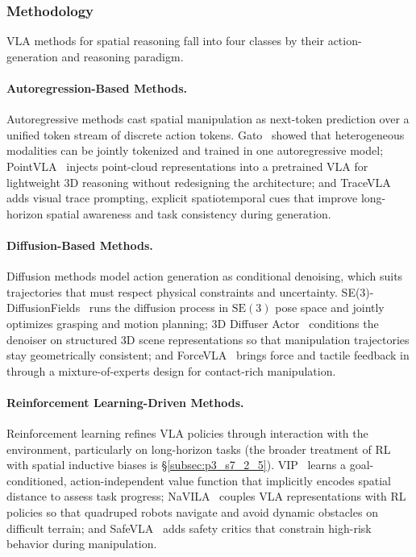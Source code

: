 
\subsubsection{Methodology}
VLA methods for spatial reasoning fall into four classes by their action-generation and reasoning paradigm.

\paragraph{Autoregression-Based Methods.}
Autoregressive methods cast spatial manipulation as next-token prediction over a unified token stream of discrete action tokens.
Gato~\cite{reed2022generalist} showed that heterogeneous modalities can be jointly tokenized and trained in one autoregressive model; PointVLA~\cite{li2025pointvla} injects point-cloud representations into a pretrained VLA for lightweight 3D reasoning without redesigning the architecture; and TraceVLA~\cite{zheng2024tracevla} adds visual trace prompting, explicit spatiotemporal cues that improve long-horizon spatial awareness and task consistency during generation.

\paragraph{Diffusion-Based Methods.}
Diffusion methods model action generation as conditional denoising, which suits trajectories that must respect physical constraints and uncertainty.
SE(3)-DiffusionFields~\cite{urain2022se} runs the diffusion process in $\mathrm{SE}(3)$ pose space and jointly optimizes grasping and motion planning; 3D Diffuser Actor~\cite{ke20243d} conditions the denoiser on structured 3D scene representations so that manipulation trajectories stay geometrically consistent; and ForceVLA~\cite{yu2025forcevla} brings force and tactile feedback in through a mixture-of-experts design for contact-rich manipulation.

\paragraph{Reinforcement Learning-Driven Methods.}
Reinforcement learning refines VLA policies through interaction with the environment, particularly on long-horizon tasks (the broader treatment of RL with spatial inductive biases is §\ref{subsec:p3_s7_2_5}).
VIP~\cite{ma2022vip} learns a goal-conditioned, action-independent value function that implicitly encodes spatial distance to assess task progress; NaVILA~\cite{cheng2024navila} couples VLA representations with RL policies so that quadruped robots navigate and avoid dynamic obstacles on difficult terrain; and SafeVLA~\cite{zhang2025safevla} adds safety critics that constrain high-risk behavior during manipulation.

